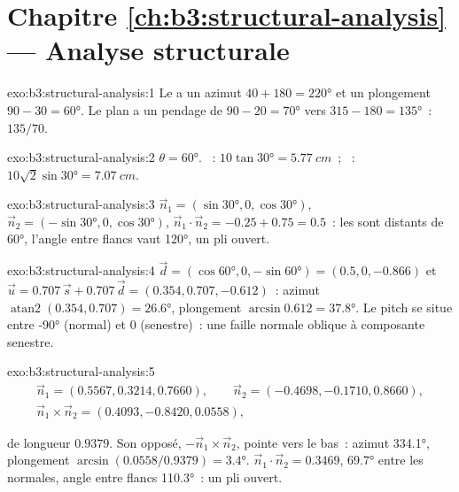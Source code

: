 \section*{Chapitre \ref{ch:b3:structural-analysis} --- Analyse structurale}

\begin{solution}{exo:b3:structural-analysis:1}
Le  a un azimut $40 + 180 = \ang{220}$ et un plongement $90 - 30 = \ang{60}$. Le
plan a un pendage de $90 - 20 = \ang{70}$ vers $315 - 180 = \ang{135}$~: $135/70$.
\end{solution}

\begin{solution}{exo:b3:structural-analysis:2}
$\theta = \ang{60}$. ~: $10\tan\ang{30} = \qty{5.77}{cm}$~;
~: $10\sqrt2\sin\ang{30} = \qty{7.07}{cm}$.
\end{solution}

\begin{solution}{exo:b3:structural-analysis:3}
$\vec n_1 = (\sin\ang{30}, 0, \cos\ang{30})$, $\vec n_2 = (-\sin\ang{30}, 0,
\cos\ang{30})$, $\vec n_1\cdot\vec n_2 = -0.25 + 0.75 = 0.5$~: les  sont
distants de \ang{60}, l'angle entre flancs vaut \ang{120}, un pli ouvert.
\end{solution}

\begin{solution}{exo:b3:structural-analysis:4}
$\vec d = (\cos\ang{60}, 0, -\sin\ang{60}) = (0.5, 0, -0.866)$ et $\vec u =
0.707\,\vec s + 0.707\,\vec d = (0.354, 0.707, -0.612)$~: azimut
$\operatorname{atan2}(0.354, 0.707) = \ang{26.6}$, plongement $\arcsin0.612 =
\ang{37.8}$. Le pitch se situe entre \ang{-90} (normal) et 0 (senestre)~: une
faille normale oblique à composante senestre.
\end{solution}

\begin{solution}{exo:b3:structural-analysis:5}
\begin{gather*}
  \vec n_1 = (0.5567, 0.3214, 0.7660),\qquad \vec n_2 = (-0.4698, -0.1710, 0.8660),\\
  \vec n_1\times\vec n_2 = (0.4093, -0.8420, 0.0558),
\end{gather*}
{\sloppy de longueur $0.9379$. Son opposé, $-\vec n_1\times\vec n_2$, pointe vers le bas~:
azimut \ang{334.1}, plongement $\arcsin(0.0558/0.9379) = \ang{3.4}$. $\vec n_1\cdot\vec
n_2 = 0.3469$, \ang{69.7} entre les normales, angle entre flancs \ang{110.3}~:
un pli ouvert.\par}
\end{solution}

